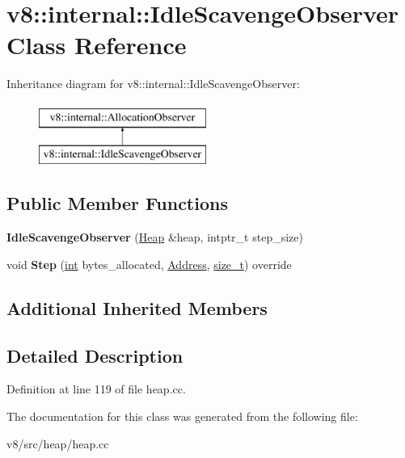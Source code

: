 \hypertarget{classv8_1_1internal_1_1IdleScavengeObserver}{}\section{v8\+:\+:internal\+:\+:Idle\+Scavenge\+Observer Class Reference}
\label{classv8_1_1internal_1_1IdleScavengeObserver}
Inheritance diagram for v8\+:\+:internal\+:\+:Idle\+Scavenge\+Observer\+:\begin{figure}[H]
\begin{center}
\leavevmode
\includegraphics[height=2.000000cm]{classv8_1_1internal_1_1IdleScavengeObserver}
\end{center}
\end{figure}
\subsection*{Public Member Functions}
\begin{DoxyCompactItemize}
\item 
\mbox{\label{classv8_1_1internal_1_1IdleScavengeObserver_aa8d090884dd90df60db6bdf24c91ce72}} 
{\bfseries Idle\+Scavenge\+Observer} (\mbox{\hyperlink{classv8_1_1internal_1_1Heap}{Heap}} \&heap, intptr\+\_\+t step\+\_\+size)
\item 
\mbox{\label{classv8_1_1internal_1_1IdleScavengeObserver_ac883860cf00cf968e03c9161cad216d5}} 
void {\bfseries Step} (\mbox{\hyperlink{classint}{int}} bytes\+\_\+allocated, \mbox{\hyperlink{classuintptr__t}{Address}}, \mbox{\hyperlink{classsize__t}{size\+\_\+t}}) override
\end{DoxyCompactItemize}
\subsection*{Additional Inherited Members}


\subsection{Detailed Description}


Definition at line 119 of file heap.\+cc.



The documentation for this class was generated from the following file\+:\begin{DoxyCompactItemize}
\item 
v8/src/heap/heap.\+cc\end{DoxyCompactItemize}
